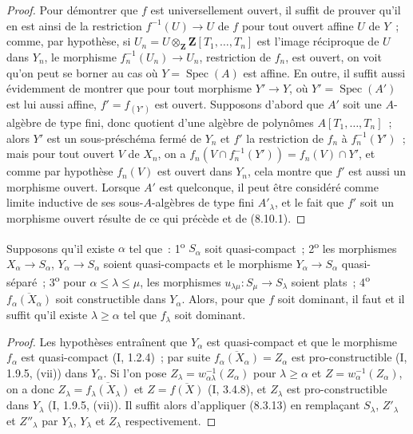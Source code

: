 \begin{proof}
Pour démontrer que $f$ est universellement ouvert, il suffit de prouver qu'il
en est ainsi de la restriction $f^{-1}(U)\to U$ de $f$ pour tout ouvert affine
$U$ de $Y$~; comme, par hypothèse, si
$U_n=U\otimes_{\mathbf Z}\mathbf Z[T_1,\ldots,T_n]$ est l'image réciproque de
$U$ dans $Y_n$, le morphisme $f_n^{-1}(U_n)\to U_n$, restriction de $f_n$, est
ouvert, on voit qu'on peut se borner au cas où $Y=\operatorname{Spec}(A)$ est
affine. En outre, il suffit aussi évidemment de montrer que pour tout
morphisme $Y'\to Y$, où $Y'=\operatorname{Spec}(A')$ est lui aussi affine,
$f'=f_{(Y')}$ est ouvert. Supposons d'abord que $A'$ soit une $A$-algèbre de
type fini, donc quotient d'une algèbre de polynômes $A[T_1,\ldots,T_n]$~;
alors $Y'$ est un sous-préschéma fermé de $Y_n$ et $f'$ la
restriction de $f_n$ à $f_n^{-1}(Y')$~; mais pour tout ouvert $V$ de $X_n$,
on a $f_n(V\cap f_n^{-1}(Y'))=f_n(V)\cap Y'$, et comme par hypothèse $f_n(V)$
est ouvert dans $Y_n$, cela montre que $f'$ est aussi un morphisme ouvert.
Lorsque $A'$ est quelconque, il peut être considéré comme limite inductive de
ses sous-$A$-algèbres de type fini $A'_\lambda$, et le fait que $f'$ soit un
morphisme ouvert résulte de ce qui précède et de (8.10.1).
\end{proof}

\begin{proposition}[8.10.3]
\label{IV.8.10.3-fr}
Supposons qu'il existe $\alpha$ tel que~: 1\textsuperscript{o} $S_\alpha$ soit
quasi-compact~; 2\textsuperscript{o} les morphismes $X_\alpha\to S_\alpha$,
$Y_\alpha\to S_\alpha$ soient quasi-compacts et le morphisme
$Y_\alpha\to S_\alpha$ quasi-séparé~; 3\textsuperscript{o} pour
$\alpha\leq\lambda\leq\mu$, les morphismes
$u_{\lambda\mu}:S_\mu\to S_\lambda$ soient plats~; 4\textsuperscript{o}
$\overline{f_\alpha(X_\alpha)}$ soit constructible dans $Y_\alpha$. Alors,
pour que $f$ soit dominant, il faut et il suffit qu'il existe
$\lambda\geq\alpha$ tel que $f_\lambda$ soit dominant.
\end{proposition}

\begin{proof}
Les hypothèses entraînent que $Y_\alpha$ est quasi-compact et que le morphisme
$f_\alpha$ est quasi-compact (I, 1.2.4)~; par suite
$\overline{f_\alpha(X_\alpha)}=Z_\alpha$ est pro-constructible (I, 1.9.5,
(vii)) dans $Y_\alpha$. Si l'on pose
$Z_\lambda=w_{\alpha\lambda}^{-1}(Z_\alpha)$ pour $\lambda\geq\alpha$ et
$Z=w_\alpha^{-1}(Z_\alpha)$, on a donc
$Z_\lambda=\overline{f_\lambda(X_\lambda)}$ et
$Z=\overline{f(X)}$ (I, 3.4.8), et $Z_\lambda$ est pro-constructible dans
$Y_\lambda$ (I, 1.9.5, (vii)). Il suffit alors d'appliquer (8.3.13) en
remplaçant $S_\lambda$, $Z'_\lambda$ et $Z''_\lambda$ par $Y_\lambda$,
$Y_\lambda$ et $Z_\lambda$ respectivement.
\end{proof}


